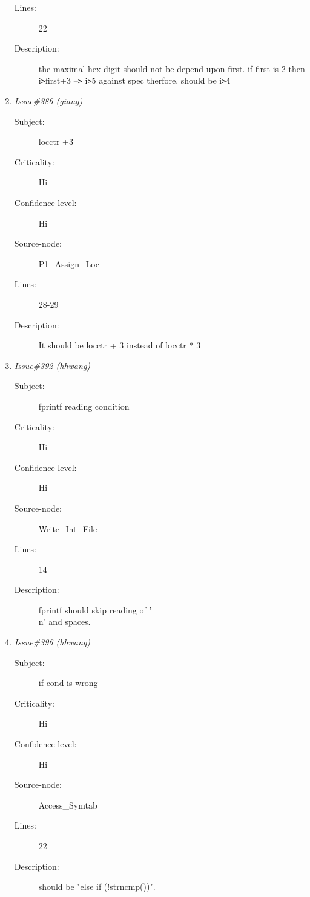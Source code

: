 \begin{enumerate}
\begin{description}
\item [Lines:] 22

\item [Description:] the maximal hex digit should not be depend upon first.  if first is 2 then
i{\tt >}first+3 --{\tt >} i{\tt >}5 against spec therfore, should be i{\tt >}4
\end{description}
\item {\it Issue\#386 (giang)}
\begin{description}
\item [Subject:] locctr +3
\item [Criticality:] Hi
\item [Confidence-level:] Hi
\item [Source-node:] P1\_Assign\_Loc

\item [Lines:] 28-29

\item [Description:] It should be locctr + 3 instead of locctr * 3
\end{description}
\item {\it Issue\#392 (hhwang)}
\begin{description}
\item [Subject:] fprintf reading condition
\item [Criticality:] Hi
\item [Confidence-level:] Hi
\item [Source-node:] Write\_Int\_File

\item [Lines:] 14

\item [Description:] fprintf should skip reading of '\\n' and spaces.
\end{description}
\item {\it Issue\#396 (hhwang)}
\begin{description}
\item [Subject:] if cond is wrong
\item [Criticality:] Hi
\item [Confidence-level:] Hi
\item [Source-node:] Access\_Symtab

\item [Lines:] 22

\item [Description:] should be "else if (!strncmp())".
\end{description}
\end{enumerate}
